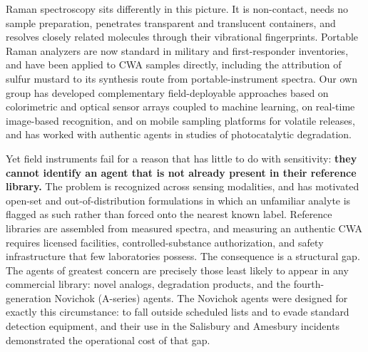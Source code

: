 \documentclass[review,12pt]{elsarticle}
\begin{document}
Raman spectroscopy sits differently in this picture. It is non-contact, needs no sample preparation, penetrates transparent and translucent containers, and resolves closely related molecules through their vibrational fingerprints. Portable Raman analyzers are now standard in military and first-responder inventories, and have been applied to CWA samples directly, including the attribution of sulfur mustard to its synthesis route from portable-instrument spectra.\cite{wiktelius2018portable} Our own group has developed complementary field-deployable approaches based on colorimetric and optical sensor arrays coupled to machine learning,\cite{hazref,kim2025multiplex,group3ref} on real-time image-based recognition,\cite{ondeviceref} and on mobile sampling platforms for volatile releases,\cite{PARK2026108691} and has worked with authentic agents in studies of photocatalytic degradation.\cite{tio2,Kim10072026}

Yet field instruments fail for a reason that has little to do with sensitivity: \textbf{they cannot identify an agent that is not already present in their reference library.}\cite{chemosensors14090189} The problem is recognized across sensing modalities, and has motivated open-set and out-of-distribution formulations in which an unfamiliar analyte is flagged as such rather than forced onto the nearest known label.\cite{KANG2026143199,drift} Reference libraries are assembled from measured spectra, and measuring an authentic CWA requires licensed facilities, controlled-substance authorization, and safety infrastructure that few laboratories possess. The consequence is a structural gap. The agents of greatest concern are precisely those least likely to appear in any commercial library: novel analogs, degradation products, and the fourth-generation Novichok (A-series) agents.\cite{kloske2019novichoks,nepovimova2018novichok,franca2019novichoks,noga2023novichoks,chai2018novichok} The Novichok agents were designed for exactly this circumstance: to fall outside scheduled lists and to evade standard detection equipment,\cite{mirzayanov2008state,bolt2022recent} and their use in the Salisbury and Amesbury incidents demonstrated the operational cost of that gap.\cite{steindl2021novichok,haslam2022cbrn}
\end{document}
